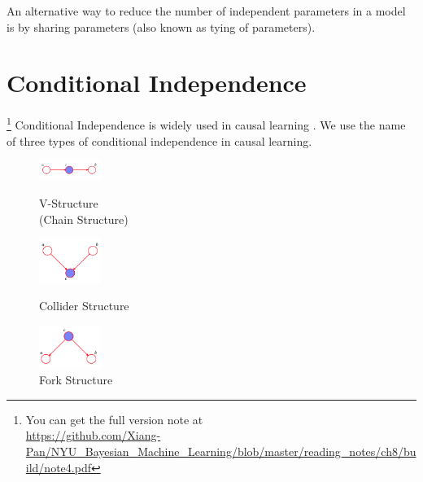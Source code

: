 \documentclass{article}
\begin{document}
An alternative way to reduce the number of independent parameters in a model is by sharing parameters (also known as tying of parameters).
\section{Conditional Independence}
\footnote{You can get the full version note at \\\url{https://github.com/Xiang-Pan/NYU_Bayesian_Machine_Learning/blob/master/reading_notes/ch8/build/note4.pdf}}
Conditional Independence is widely used in causal learning \cite{pearl2016causal}. We use the name of three types of conditional independence in causal learning.
\begin{figure}[!htb]
    \centering
    \begin{minipage}[t]{0.32\textwidth}
        \centering
        \includegraphics[width=2cm]{./images/2021-09-15-17-49-28.png}
        \caption{V-Structure \\ (Chain Structure)}
    \end{minipage}
    \begin{minipage}[t]{0.32\textwidth}
        \centering
        \includegraphics[width=2cm]{./images/2021-09-15-17-43-00.png}
        \caption{Collider Structure} 
    \end{minipage}
    \begin{minipage}[t]{0.32\textwidth}
        \centering
        \includegraphics[width=2cm]{./images/2021-09-15-17-43-54.png}
        \caption{Fork Structure}
    \end{minipage}
\end{figure}
\end{document}
